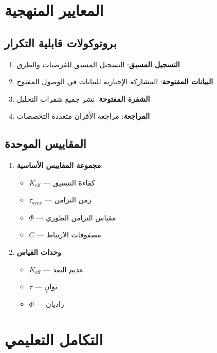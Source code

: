 \documentclass[12pt,a4paper]{article}
\begin{document}
	\section{المعايير المنهجية}
	
	\subsection{بروتوكولات قابلية التكرار}
	
	\begin{enumerate}
		\item \textbf{التسجيل المسبق}: التسجيل المسبق للفرضيات والطرق
		\item \textbf{البيانات المفتوحة}: المشاركة الإجبارية للبيانات في الوصول المفتوح
		\item \textbf{الشفرة المفتوحة}: نشر جميع شفرات التحليل
		\item \textbf{المراجعة}: مراجعة الأقران متعددة التخصصات
	\end{enumerate}
	
	\subsection{المقاييس الموحدة}
	
	\begin{enumerate}
		\item \textbf{مجموعة المقاييس الأساسية}:
		\begin{itemize}
			\item $K_{\mathrm{eff}}$ — كفاءة التنسيق
			\item $\tau_{\mathrm{sync}}$ — زمن التزامن
			\item $\Phi$ — مقياس التزامن الطوري
			\item $C$ — مصفوفات الارتباط
		\end{itemize}
		
		\item \textbf{وحدات القياس}:
		\begin{itemize}
			\item $K_{\mathrm{eff}}$ — عديم البعد
			\item $\tau$ — ثوانٍ
			\item $\Phi$ — راديان
		\end{itemize}
	\end{enumerate}
	
	\section{التكامل التعليمي}
	
\end{document}
